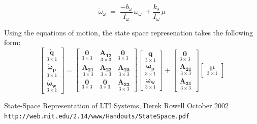 \documentclass{article}
\begin{document}
$$\dot{\omega}_\omega\; =\;
\frac{-b_\omega}{I_\omega}\,\omega_\omega\;
+ \frac{k_s}{I_\omega}\,\mu$$

Using the equations of motion, the state space represenation takes
the following form:
\[
\begin{bmatrix}
\underset{3\times 1}{\boldsymbol{\dot{q}}} \\
\underset{3\times 1}{\boldsymbol{\dot{\omega}_p}} \\
\underset{3\times 1}{\boldsymbol{\dot{\omega}_w}}
\end{bmatrix}
=
\begin{bmatrix}
\underset{3\times 3}{\boldsymbol{0}} & \underset{3\times 3}{\boldsymbol{A_{12}}} & \underset{3\times 3}{\boldsymbol{0}} \\
\underset{3\times 3}{\boldsymbol{A_{21}}} & \underset{3\times 3}{\boldsymbol{A_{22}}} & \underset{3\times 3}{\boldsymbol{A_{23}}} \\
\underset{3\times 3}{\boldsymbol{0}} & \underset{3\times 3}{\boldsymbol{0}} & \underset{3\times 3}{\boldsymbol{A_{33}}}
\end{bmatrix}
\begin{bmatrix}
\underset{3\times 1}{\boldsymbol{q}} \\
\underset{3\times 1}{\boldsymbol{\omega_p}} \\
\underset{3\times 1}{\boldsymbol{\omega_w}}
\end{bmatrix}
+
\begin{bmatrix}
\underset{3\times 3}{\boldsymbol{0}} \\
\underset{3\times 3}{\boldsymbol{A_{21}}} \\
\underset{3\times 3}{\boldsymbol{A_{31}}}
\end{bmatrix}
\begin{bmatrix}
\underset{3\times 1}{\boldsymbol{\mu}}
\end{bmatrix}
\]

\begin{thebibliography}{9}
State-Space Representation of LTI Systems, Derek Rowell October 2002
\\\texttt{http://web.mit.edu/2.14/www/Handouts/StateSpace.pdf}
\end{thebibliography}
\end{document}
